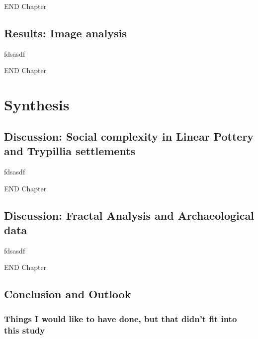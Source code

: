 \documentclass[
  12pt,
]{book}
\begin{document}
END Chapter

\hypertarget{results-image-analysis}{%
\chapter{Results: Image analysis}\label{results-image-analysis}}

fdsasdf

END Chapter

\hypertarget{part-synthesis}{%
\part{Synthesis}\label{part-synthesis}}

\hypertarget{discussion-social-complexity-in-linear-pottery-and-trypillia-settlements}{%
\chapter{Discussion: Social complexity in Linear Pottery and Trypillia settlements}\label{discussion-social-complexity-in-linear-pottery-and-trypillia-settlements}}

fdsasdf

END Chapter

\hypertarget{discussion-fractal-analysis-and-archaeological-data}{%
\chapter{Discussion: Fractal Analysis and Archaeological data}\label{discussion-fractal-analysis-and-archaeological-data}}

fdsasdf

END Chapter

\hypertarget{conclusion-and-outlook}{%
\chapter{Conclusion and Outlook}\label{conclusion-and-outlook}}

\hypertarget{things-i-would-like-to-have-done-but-that-didnt-fit-into-this-study}{%
\section{Things I would like to have done, but that didn't fit into this study}\label{things-i-would-like-to-have-done-but-that-didnt-fit-into-this-study}}
\end{document}
